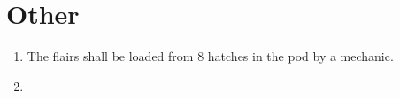 \documentclass[Main]{subfiles}
\begin{document}
\section{Other}

\begin{enumerate}[resume*]

\item The flairs shall be loaded from 8 hatches in the pod by a mechanic.

\item 

\end{enumerate}
\end{document}
